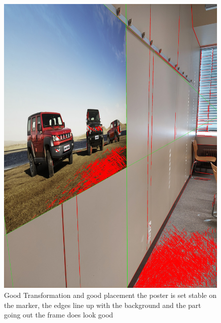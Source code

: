 \documentclass[a4paper,twocolumn]{article}
\begin{document}
    \begin{figure}[h!]
    \centering
    \includegraphics[width=0.9\columnwidth]{img/20221115_113440.jpg} %
    \caption{Good Transformation and good placement the poster is set stable on the marker, the edges line up with the background and the part going out the frame does look good}
    \label{fig:20221115_113440.jpg}
    \end{figure}
    
    \\
\\
\end{document}
